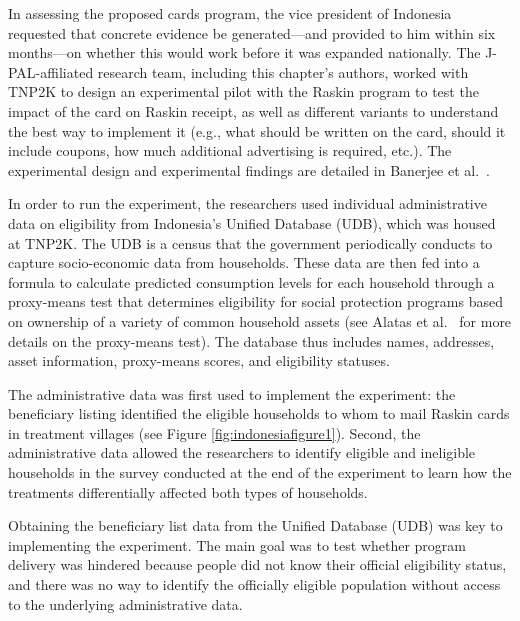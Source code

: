 In assessing the proposed cards program, the vice president of Indonesia requested that concrete evidence be generated---and provided to him within six months---on whether this would work before it was expanded nationally. The J-PAL-affiliated research team, including this chapter's authors, worked with TNP2K to design an experimental pilot with the Raskin program to test the impact of the card on Raskin receipt, as well as different variants to understand the best way to implement it (e.g., what should be written on the card, should it include coupons, how much additional advertising is required, etc.). The experimental design and experimental findings are detailed in Banerjee et al.~\citeyearpar{banerjee2018}.

In order to run the experiment, the researchers used individual administrative data on eligibility from Indonesia's Unified Database (UDB), which was housed at TNP2K. The UDB is a census that the government periodically conducts to capture socio-economic data from households. These data are then fed into a formula to calculate predicted consumption levels for each household through a proxy-means test that determines eligibility for social protection programs based on ownership of a variety of common household assets (see Alatas et al.~\citeyearpar{alatas2012} for more details on the proxy-means test). The database thus includes names, addresses, asset information, proxy-means scores, and eligibility statuses.

The administrative data was first used to implement the experiment: the beneficiary listing identified the eligible households to whom to mail Raskin cards in treatment villages (see Figure \ref{fig:indonesiafigure1}). Second, the administrative data allowed the researchers to identify eligible and ineligible households in the survey conducted at the end of the experiment to learn how the treatments differentially affected both types of households.

Obtaining the beneficiary list data from the Unified Database (UDB) was key to implementing the experiment. The main goal was to test whether program delivery was hindered because people did not know their official eligibility status, and there was no way to identify the officially eligible population without access to the underlying administrative data.

